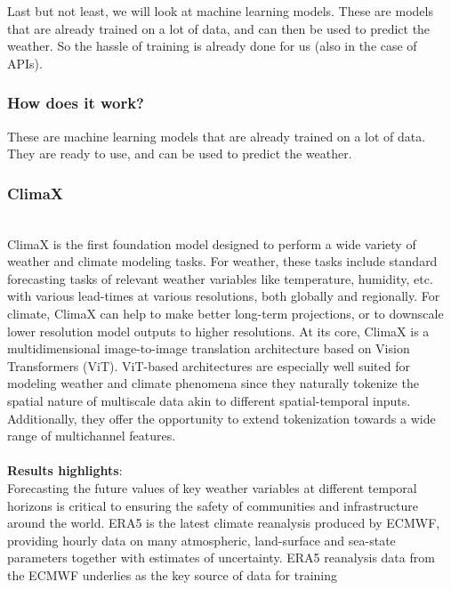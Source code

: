 \documentclass[../paper.tex]{subfiles}
\begin{document}
    Last but not least, we will look at machine learning models.
    These are models that are already trained on a lot of data, and can then be used to predict the weather.
    So the hassle of training is already done for us (also in the case of APIs).

    \subsubsection{How does it work?}
    These are machine learning models that are already trained on a lot of data.
    They are ready to use, and can be used to predict the weather.

    \subsubsection{ClimaX}
        \hfill\\
        ClimaX is the first foundation model designed to perform a wide variety of weather and climate modeling tasks.
        For weather, these tasks include standard forecasting tasks of relevant weather variables like temperature,
        humidity, etc.
        with various lead-times at various resolutions, both globally and regionally.
        For climate, ClimaX can help to make better long-term projections,
        or to downscale lower resolution model outputs to higher resolutions.
        At its core, ClimaX is a multidimensional image-to-image translation architecture based on Vision Transformers
        (ViT).
        ViT-based architectures are especially well suited for modeling weather and climate phenomena
        since they naturally tokenize the spatial nature of multiscale data akin to different spatial-temporal inputs.
        Additionally,
        they offer the opportunity to extend tokenization towards a wide range of multichannel features\cite{d1}.
        \\\\
        \textbf{Results highlights}:\\
            Forecasting the future values of key weather variables at different temporal horizons is critical
            to ensuring the safety of communities and infrastructure around the world.
            ERA5 is the latest climate reanalysis produced by ECMWF,
            providing hourly data on many atmospheric,
            land-surface and sea-state parameters together with estimates of uncertainty\cite{d2}.
            ERA5 reanalysis data from the ECMWF underlies as the key source of data for training
\end{document}

